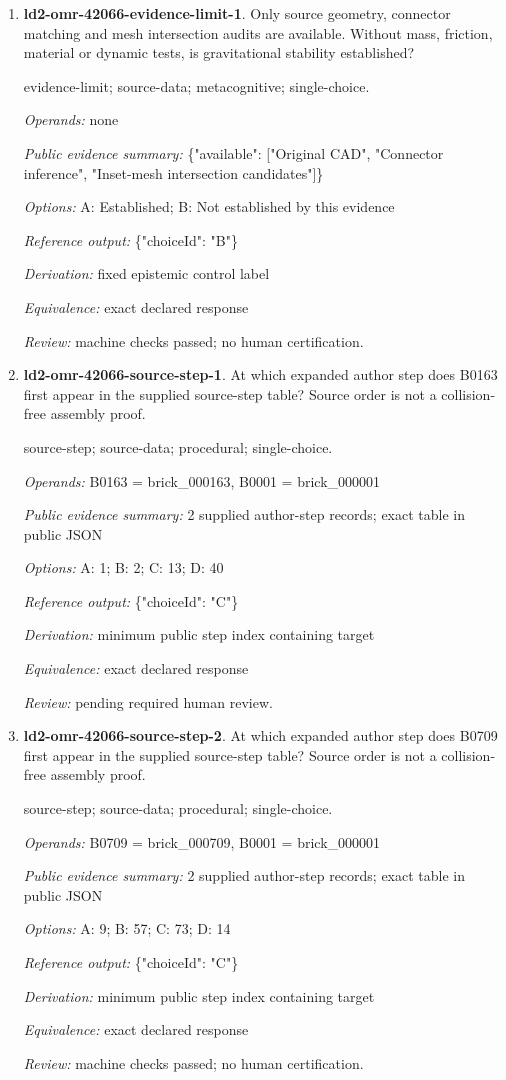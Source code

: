 \begin{enumerate}
\item \textbf{ld2-omr-42066-evidence-limit-1}. Only source geometry, connector matching and mesh intersection audits are available. Without mass, friction, material or dynamic tests, is gravitational stability established?
\par{\small evidence-limit; source-data; metacognitive; single-choice.\par\textit{Operands:} none\par\textit{Public evidence summary:} \{"available": ["Original CAD", "Connector inference", "Inset-mesh intersection candidates"]\}\par\textit{Options:} A: Established; B: Not established by this evidence\par\textit{Reference output:} \{"choiceId": "B"\}\par\textit{Derivation:} fixed epistemic control label\par\textit{Equivalence:} exact declared response\par\textit{Review:} machine checks passed; no human certification.}
\item \textbf{ld2-omr-42066-source-step-1}. At which expanded author step does B0163 first appear in the supplied source-step table? Source order is not a collision-free assembly proof.
\par{\small source-step; source-data; procedural; single-choice.\par\textit{Operands:} B0163 = brick\_000163, B0001 = brick\_000001\par\textit{Public evidence summary:} 2 supplied author-step records; exact table in public JSON\par\textit{Options:} A: 1; B: 2; C: 13; D: 40\par\textit{Reference output:} \{"choiceId": "C"\}\par\textit{Derivation:} minimum public step index containing target\par\textit{Equivalence:} exact declared response\par\textit{Review:} pending required human review.}
\item \textbf{ld2-omr-42066-source-step-2}. At which expanded author step does B0709 first appear in the supplied source-step table? Source order is not a collision-free assembly proof.
\par{\small source-step; source-data; procedural; single-choice.\par\textit{Operands:} B0709 = brick\_000709, B0001 = brick\_000001\par\textit{Public evidence summary:} 2 supplied author-step records; exact table in public JSON\par\textit{Options:} A: 9; B: 57; C: 73; D: 14\par\textit{Reference output:} \{"choiceId": "C"\}\par\textit{Derivation:} minimum public step index containing target\par\textit{Equivalence:} exact declared response\par\textit{Review:} machine checks passed; no human certification.}

\end{enumerate}
